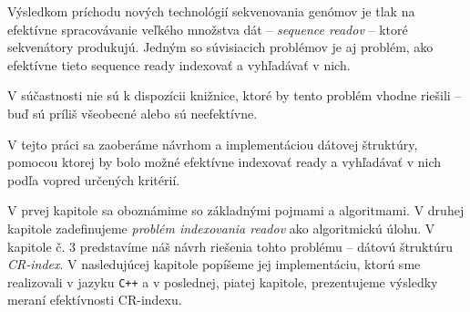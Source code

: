Výsledkom príchodu nových technológií sekvenovania genómov je tlak na efektívne spracovávanie veľkého množstva dát -- \emph{sequence readov} -- ktoré sekvenátory produkujú. Jedným so súvisiacich problémov je aj problém, ako efektívne tieto sequence ready indexovať a vyhľadávať v nich.

V súčastnosti nie sú k dispozícii knižnice, ktoré by tento problém vhodne riešili -- buď sú príliš všeobecné alebo sú neefektívne.

V tejto práci sa zaoberáme návrhom a implementáciou dátovej štruktúry, pomocou ktorej by bolo možné efektívne indexovať ready a vyhľadávať v nich podľa vopred určených kritérií.

V prvej kapitole sa oboznámime so základnými pojmami a algoritmami. V druhej kapitole zadefinujeme \emph{problém indexovania readov} ako algoritmickú úlohu. V kapitole č. 3 predstavíme náš návrh riešenia tohto problému -- dátovú štruktúru \emph{CR-index}. V nasledujúcej kapitole popíšeme jej implementáciu, ktorú sme realizovali v jazyku \texttt{C++} a v poslednej, piatej kapitole, prezentujeme výsledky meraní efektívnosti CR-indexu.